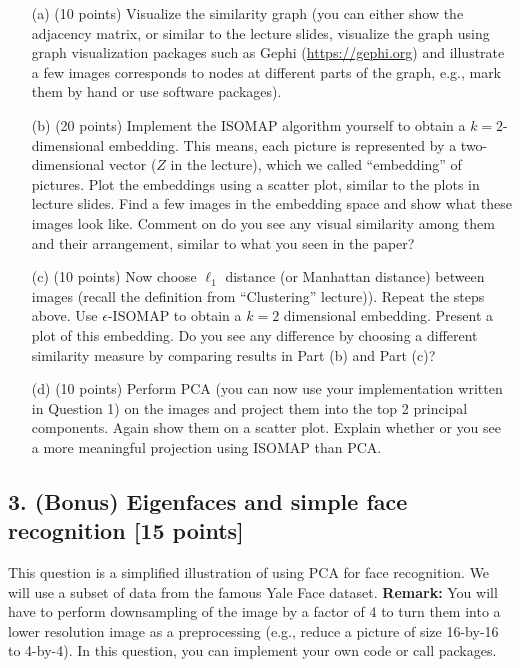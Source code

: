 \documentclass[twoside,12pt]{article}
\begin{document}
\begin{enumerate} 

\item[(a)] (10 points) Visualize the similarity graph (you can either show the adjacency matrix, or similar to the lecture slides, visualize the graph using graph visualization packages such as Gephi (\url{https://gephi.org}) and illustrate a few images corresponds to nodes at different parts of the graph, e.g., mark them by hand or use software packages).
 
\item[(b)] (20 points) Implement the ISOMAP algorithm yourself to obtain a $k = 2$-dimensional embedding. This means, each picture is represented by a two-dimensional vector ($Z$ in the lecture), which we called ``embedding'' of pictures. Plot the embeddings using a scatter plot, similar to the plots in lecture slides. Find a few images in the embedding space and show what these images look like. Comment on do you see any visual similarity among them and their arrangement, similar to what you seen in the paper?

\item[(c)] (10 points) Now choose $\ell_1$ distance (or Manhattan distance) between images (recall the definition from ``Clustering'' lecture)). Repeat the steps above. Use $\epsilon$-ISOMAP to obtain a $k=2$ dimensional embedding. Present a plot of this embedding. Do you see any difference by choosing a different similarity measure by comparing results in Part (b) and Part (c)? 

\item[(d)] (10 points) Perform PCA (you can now use your implementation written in Question 1) on the images and project them into the top 2 principal components. Again show them on a scatter plot. Explain whether or you see a more meaningful projection using ISOMAP than PCA. 

\end{enumerate}


\subsection*{3. (Bonus) Eigenfaces and simple face recognition [15 points]}

This question is a simplified illustration of using PCA for face recognition. We will use a subset of data from the famous Yale Face dataset. {\bf Remark:} You will have to perform downsampling of the image by a factor of 4 to turn them into a lower resolution image as a preprocessing (e.g., reduce a picture of size 16-by-16 to 4-by-4). In this question, you can implement your own code or call packages. 
\end{document}
